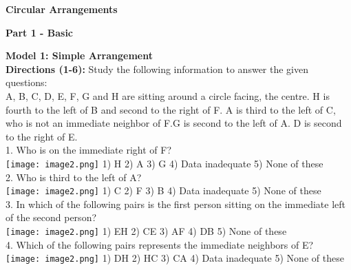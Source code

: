 \documentclass[
]{article}
\author{}
\date{}
\begin{document}
	
 

\begin{center}
	{\Large \textbf{Circular Arrangements \\}}
\end{center}

{\large \textbf{ Part 1 - Basic \\}}


\textbf{Model 1: Simple Arrangement}\\

\textbf{Directions (1-6):} Study the following information to answer the given questions:\\
A, B, C, D, E, F, G and H are sitting around a circle facing, the centre. H is fourth to the left of B
and second to the right of F. A is third to the left of C, who is not an immediate neighbor of F.G
is second to the left of A. D is second to the right of E.\\

1. Who is on the immediate right of F?\\
\texttt{[image: image2.png]}
1) H \hspace{2mm}2) A \hspace{2mm}3) G
\hspace{2mm}4) Data inadequate \hspace{2mm}5) None of these\\

2. Who is third to the left of A?\\
\texttt{[image: image2.png]}
1) C \hspace{2mm}2) F \hspace{2mm}3) B
\hspace{2mm}4) Data inadequate \hspace{2mm}5) None of these\\

3. In which of the following pairs is the first person sitting on the immediate left of the second
person?\\
\texttt{[image: image2.png]}
1) EH \hspace{2mm}2) CE \hspace{2mm}3) AF \hspace{2mm}4) DB \hspace{2mm}5) None of these\\

4. Which of the following pairs represents the immediate neighbors of E?\\
\texttt{[image: image2.png]}
1) DH \hspace{2mm}2) HC \hspace{2mm}3) CA
\hspace{2mm}4) Data inadequate \hspace{2mm}5) None of these\\
\end{document}
